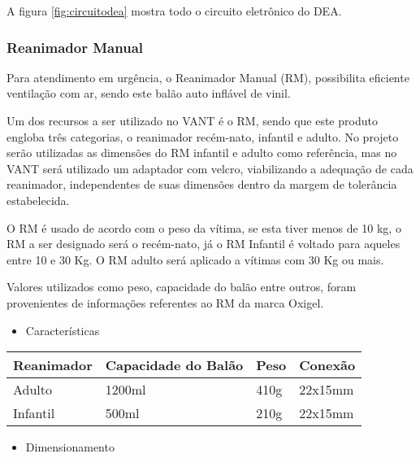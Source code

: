 A figura \ref{fig:circuitodea} mostra todo o circuito eletrônico do DEA.


\subsubsection{Reanimador Manual}
Para atendimento em urgência, o Reanimador Manual (RM), possibilita eficiente ventilação com ar, sendo este balão auto inflável de vinil.

Um dos recursos a ser utilizado no VANT é o RM, sendo que este produto engloba três categorias, o reanimador recém-nato, infantil e adulto. No projeto serão utilizadas as dimensões do RM infantil e adulto como referência, mas no VANT será utilizado um adaptador com velcro, viabilizando a adequação de cada reanimador, independentes de suas dimensões dentro da margem de tolerância estabelecida.

O RM é usado de acordo com o peso da vítima, se esta tiver menos de 10 kg, o RM a ser designado será o recém-nato, já o RM Infantil é voltado para aqueles entre 10 e 30 Kg. O RM adulto será aplicado a vítimas com 30 Kg ou mais.

Valores utilizados como peso, capacidade do balão entre outros, foram provenientes de informações referentes ao RM da marca Oxigel.

\begin{itemize}
	\item Características
\end{itemize}

\begin{table}[h]
\begin{tabular}{|l|l|l|l|}
\hline
\multicolumn{1}{|c|}{Reanimador} & Capacidade do Balão & Peso & Conexão \\ \hline
Adulto                           & 1200ml              & 410g & 22x15mm \\ \hline
Infantil                         & 500ml               & 210g & 22x15mm \\ \hline
\end{tabular}
\end{table}


\begin{itemize}
	\item Dimensionamento
\end{itemize}

